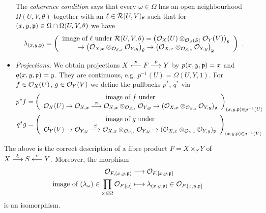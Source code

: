 \documentclass[a4paper,parskip=half,numbers=enddot, DIV=12]{scrreprt}
\begin{document}
\begin{itemize}
	The \emph{coherence condition} says that every $\omega\in\Omega$ has an open neighbourhood $\Omega(U,V,\theta)$ together with an $\ell\in\mathcal{R}(U,V)_{\theta}$ such that for $(x,y,\mathfrak{p})\in\Omega\cap\Omega(U,V,\theta)$ we have
	\begin{align*}
		\lambda_{(x,y,\pp)}=\left(
		\begin{array}{c}
			\text{image of }\ell\text{ under }\Rr(U,V,\theta)=\left(\Oo_X(U)\otimes_{\Oo_S(S)}\Oo_Y(V)\right)_\theta\\
			\morphism\left(\Oo_{X,x}\otimes_{\Oo_{S,s}}\Oo_{Y,y}\right)_\theta\morphism\left(\Oo_{X,x}\otimes_{\Oo_{S,s}}\Oo_{Y,y}\right)_\pp
		\end{array}\right)\;.
	\end{align*}
	\item \emph{Projections.} We obtain projections $X\lmorphism[p]F\morphism[p] Y$ by $p(x,y,\mathfrak{p}) = x$ and $q(x,y,\mathfrak{p}) = y$. They are continuous, e.g. $p^{-1}(U)=\Omega(U,Y,1)$. For $f\in\mathcal{O}_X(U)$, $g\in \mathcal{O}_Y(V)$ we define the pullbacks $p^*$, $q^*$ via
	\begin{align*}
        p^*f&= \left(
        \begin{array}{c}
	        \text{image of } f\text{ under}\\
	         \Oo_X(U) \morphism\Oo_{X,x} \morphism[\alpha] \Oo_{X,x}\otimes_{\Oo_{S,s}}\Oo_{Y,y} \morphism (\Oo_{X,x}\otimes_{\Oo_{S,s}}\Oo_{Y,y})_\pp
        \end{array}\right)_{(x,y,\pp) \in p^{-1}(U)}\\
        q^*g&=  \left(
        \begin{array}{c}
	        \text{image of } g\text{ under}\\
	         \Oo_Y(V) \morphism\Oo_{Y,y} \morphism[\beta] \Oo_{X,x}\otimes_{\Oo_{S,s}}\Oo_{Y,y} \morphism (\Oo_{X,x}\otimes_{\Oo_{S,s}}\Oo_{Y,y})_\pp
	         \end{array}\right)_{(x,y,\pp) \in q^{-1}(V)}
	\end{align*}
\end{itemize}
\begin{prop}
    The above is the correct description of a fibre product $F=X\times_SY$ of $X\morphism[\xi]S\lmorphism[\upsilon]Y$. Moreover, the morphism
    \begin{align*}
        \Oo_{F,(x,y,\pp)} &\morphism \Oo_{F,[x,y,\pp]}\\
        \text{image of }(\lambda_\omega)\in\prod_{\omega\in\Omega}\Oo_{F,[\omega]}&\longmapsto\lambda_{(x,y,\pp)}\in\Oo_{F,[x,y,\pp]}
    \end{align*}
    is an isomorphism.
\end{prop}
\end{document}
